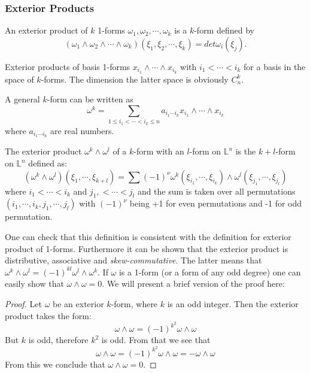 \subsubsection{Exterior Products}
\begin{definition}
An exterior product of $k$ 1-forms $\omega_1,\omega_2,\cdots,\omega_k$ is
a $k$-form defined by
\begin{equation}
  (\omega_1\wedge\omega_2\wedge\cdots\wedge\omega_k)(\xi_1,\xi_2,\cdots,\xi_k)
  = det\omega_i(\xi_j).
\end{equation}
\end{definition}
\begin{remark}
  Exterior products of basis 1-forms $x_{i_1}\wedge\cdots\wedge x_{i_k}$ with
  $i_1<\cdots<i_k$ for a basis in the space of $k$-forms. The dimension the latter
  space is obviously $C_n^k$.
\end{remark}
A general $k$-form can be written as
\begin{equation}
  \omega^k = \sum_{1\leq i_1<\cdots<i_k\leq n}{a_{i_1\cdots
  i_k}x_{i_1}\wedge\cdots\wedge x_{i_k}}
\end{equation}
where $a_{i_1\cdots i_k}$ are real numbers.

\begin{definition}
  The exterior product $\omega^k\wedge\omega^l$ of a $k$-form with an $l$-form
  on $\mathbb{L}^n$ is the $k+l$-form on $\mathbb{L}^n$ defined as:
  \begin{equation}
    (\omega^k\wedge\omega^l)(\xi_1,\cdots,\xi_{k+l})
    = \sum{(-1)^\nu\omega^k(\xi_{i_1},\cdots,\xi_{i_k})\wedge\omega^l(\xi_{j_1},\cdots,\xi_{j_l})}
  \end{equation}
  where $i_1<\cdots<i_k$ and $j_1,<\cdots<j_l$ and the sum is taken over all
  permutations $(i_1,\cdots,i_k,j_1,\cdots,j_l)$ with $(-1)^\nu$ being +1
  for even permutations and -1 for odd permutation.
\end{definition}
One can check that this definition is consistent with the definition for
exterior product of 1-forms. Furthermore it can be shown that the exterior
product is distributive, associative and \textit{skew-commutative}. The latter
means that $\omega^k\wedge\omega^l = (-1)^{kl}\omega^l\wedge\omega^k$. If
$\omega$ is a 1-form (or a form of any odd degree) one can easily show that
$\omega\wedge\omega=0$. We will present a brief version of the proof here:
\begin{proof}
Let $\omega$ be an exterior $k$-form, where $k$ is an odd integer. Then the
exterior product takes the form:
 \begin{equation}
 \omega\wedge\omega = (-1)^{k^2}\omega\wedge\omega
 \end{equation}
 But $k$ is odd, therefore $k^2$ is odd. From that we see that
 \begin{equation}
   \omega\wedge\omega = (-1)^{k^2}\omega\wedge\omega = -\omega\wedge\omega
 \end{equation}
 From this we conclude that $\omega\wedge\omega = 0$.
\end{proof}
